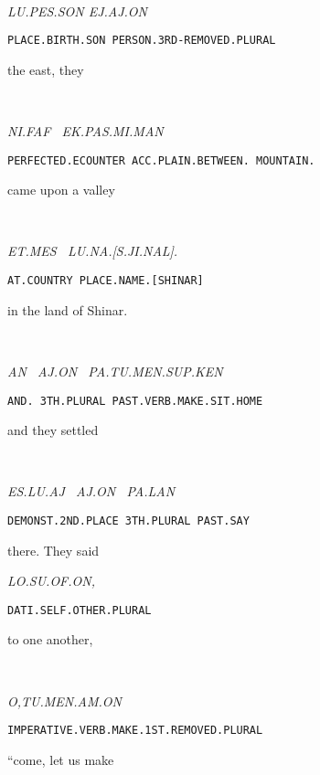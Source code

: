 {\lu\pes\son ~  \aj\on

{\it LU.PES.SON 	EJ.AJ.ON }

{\tt PLACE.BIRTH.SON	PERSON.3RD-REMOVED.PLURAL }

the east, 		they 		 


\drie 


\Atlanni\faf~\ek\pas\mi\man

{\it NI.FAF~                                EK.PAS.MI.MAN }

{\tt PERFECTED.ECOUNTER  	ACC.PLAIN.BETWEEN. MOUNTAIN.	}

came upon 		a valley                 


\drie  


\et\mes~\lu\na\cartouche{\Atlans\ji\nal}\period

{\it ET.MES~		LU.NA.[S.JI.NAL]. }

{\tt AT.COUNTRY	PLACE.NAME.[SHINAR] }

in the land          of Shinar. 

\drie



\an~\aj\on~\pa\tu\men\Atlansup\ken

{\it AN~	AJ.ON~   PA.TU.MEN.SUP.KEN }

{\tt AND.	3TH.PLURAL	PAST.VERB.MAKE.SIT.HOME	 }

and 	they 		settled			 

\drie
  


\es\lu\aj~\period \aj\on~\pa\lan

{\it ES.LU.AJ~		AJ.ON~		PA.LAN	 }

{\tt DEMONST.2ND.PLACE	3TH.PLURAL	PAST.SAY }

there.			They		said 	 

\drie 


\lo\su\of\on\comma

{\it LO.SU.OF.ON, }

{\tt DATI.SELF.OTHER.PLURAL		 }
 
to one another, 			 
\drie 



  

\Atlano\comma\tu\men\am\on\

{\it O,TU.MEN.AM.ON }

{\tt IMPERATIVE.VERB.MAKE.1ST.REMOVED.PLURAL }

“come, let us make   


\drie 


\ek\fuk\jet\on\comma\Atlani\an\

}

